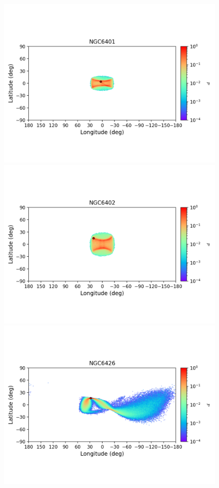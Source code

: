 \begin{figure}
        \includegraphics[clip=true, trim = 0mm 20mm 0mm 10mm, width=1\columnwidth]{images/error_plots_NGC6401.png}
        \includegraphics[clip=true, trim = 0mm 20mm 0mm 10mm, width=1\columnwidth]{images/error_plots_NGC6402.png}
        \includegraphics[clip=true, trim = 0mm 20mm 0mm 10mm, width=1\columnwidth]{images/error_plots_NGC6426.png}

\end{figure}
